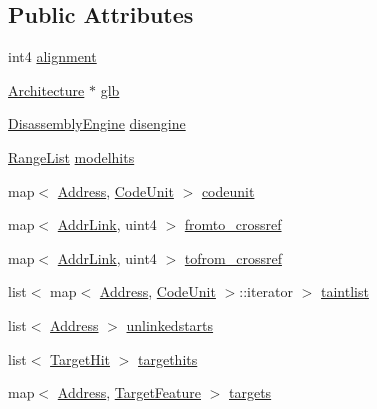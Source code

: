 \subsection*{Public Attributes}
\begin{DoxyCompactItemize}
\item 
int4 \mbox{\hyperlink{class_code_data_analysis_a1f4e342373fe3b26b02fc9cc07fc4cde}{alignment}}
\item 
\mbox{\hyperlink{class_architecture}{Architecture}} $\ast$ \mbox{\hyperlink{class_code_data_analysis_a3c42ba4de31cfbe754538420bc1c3281}{glb}}
\item 
\mbox{\hyperlink{class_disassembly_engine}{Disassembly\+Engine}} \mbox{\hyperlink{class_code_data_analysis_a9ae1dd22443a06992d53129be1e97404}{disengine}}
\item 
\mbox{\hyperlink{class_range_list}{Range\+List}} \mbox{\hyperlink{class_code_data_analysis_a626bdcd7e8956d51c4ea0ed0c1473a40}{modelhits}}
\item 
map$<$ \mbox{\hyperlink{class_address}{Address}}, \mbox{\hyperlink{class_code_unit}{Code\+Unit}} $>$ \mbox{\hyperlink{class_code_data_analysis_abbf92545b2c660b34199932f22d74523}{codeunit}}
\item 
map$<$ \mbox{\hyperlink{struct_addr_link}{Addr\+Link}}, uint4 $>$ \mbox{\hyperlink{class_code_data_analysis_aa4095aa8e677214f3a6b7abe817d24f4}{fromto\+\_\+crossref}}
\item 
map$<$ \mbox{\hyperlink{struct_addr_link}{Addr\+Link}}, uint4 $>$ \mbox{\hyperlink{class_code_data_analysis_ac284b65ea4121cecbeeac54fdb466cee}{tofrom\+\_\+crossref}}
\item 
list$<$ map$<$ \mbox{\hyperlink{class_address}{Address}}, \mbox{\hyperlink{class_code_unit}{Code\+Unit}} $>$\+::iterator $>$ \mbox{\hyperlink{class_code_data_analysis_aeaaace760ea39195437919ece684c69c}{taintlist}}
\item 
list$<$ \mbox{\hyperlink{class_address}{Address}} $>$ \mbox{\hyperlink{class_code_data_analysis_a3d2f7273689a3802d8b2aa615c6352a5}{unlinkedstarts}}
\item 
list$<$ \mbox{\hyperlink{class_target_hit}{Target\+Hit}} $>$ \mbox{\hyperlink{class_code_data_analysis_aae3eb34a130a61c4b6ddfb688a10ac3d}{targethits}}
\item 
map$<$ \mbox{\hyperlink{class_address}{Address}}, \mbox{\hyperlink{struct_target_feature}{Target\+Feature}} $>$ \mbox{\hyperlink{class_code_data_analysis_a07bd461ce70fb7e87a8f8e62378ca857}{targets}}
\end{DoxyCompactItemize}


